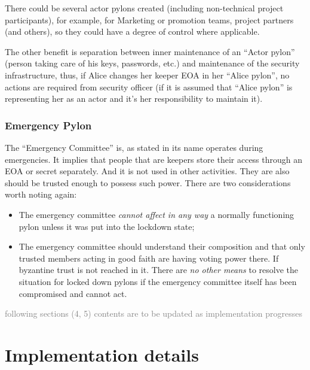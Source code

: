\documentclass[12pt]{article}
\begin{document}
There could be several actor pylons created (including non-technical project participants), for example, for Marketing or promotion teams, project partners (and others), so they could have a degree of control where applicable.

The other benefit is separation between inner maintenance of an ``Actor pylon'' (person taking care of his keys, passwords, etc.) and maintenance of the security infrastructure, thus, if Alice changes her keeper EOA in her ``Alice pylon'', no actions are required from security officer (if it is assumed that ``Alice pylon'' is representing her as an actor and it's her responsibility to maintain it).

\subsubsection{Emergency Pylon}

The ``Emergency Committee'' is, as stated in its name operates during emergencies. It implies that people that are keepers store their access through an EOA or secret separately. And it is not used in other activities.
They are also should be trusted enough to possess such power. There are two considerations worth noting again:
\begin{itemize}
\item{The emergency committee \emph{cannot affect in any way} a normally functioning pylon unless it was put into the lockdown state;}
\item{The emergency committee should understand their composition and that only trusted members acting in good faith are having voting power there. If byzantine trust is not reached in it. There are \emph{no other means} to resolve the situation for locked down pylons if the emergency committee itself has been compromised and cannot act.}
\end{itemize}



\pagebreak
\noindent \textcolor{gray}{\small{following sections (4, 5) contents are to be updated as implementation progresses}}
\section{Implementation details}
\end{document}
